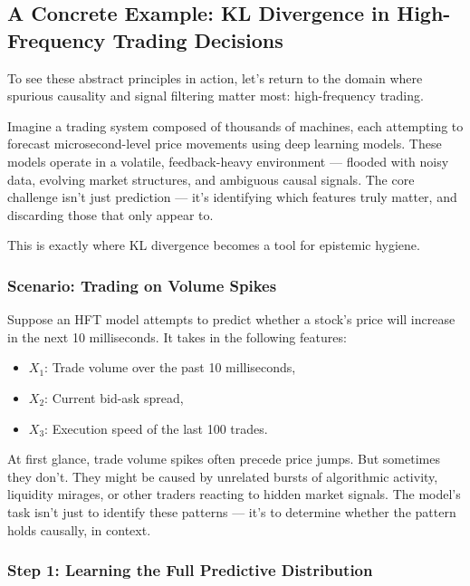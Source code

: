 \subsection{A Concrete Example: KL Divergence in High-Frequency Trading Decisions}

To see these abstract principles in action, let’s return to the domain where spurious causality and signal filtering matter most: high-frequency trading.

Imagine a trading system composed of thousands of machines, each attempting to forecast microsecond-level price movements using deep learning models. These models operate in a volatile, feedback-heavy environment — flooded with noisy data, evolving market structures, and ambiguous causal signals. The core challenge isn’t just prediction — it’s identifying which features truly matter, and discarding those that only appear to.

This is exactly where KL divergence becomes a tool for epistemic hygiene.

\subsubsection{Scenario: Trading on Volume Spikes}

Suppose an HFT model attempts to predict whether a stock’s price will increase in the next 10 milliseconds. It takes in the following features:

\begin{itemize}
    \item \( X_1 \): Trade volume over the past 10 milliseconds,
    \item \( X_2 \): Current bid-ask spread,
    \item \( X_3 \): Execution speed of the last 100 trades.
\end{itemize}

At first glance, trade volume spikes often precede price jumps. But sometimes they don't. They might be caused by unrelated bursts of algorithmic activity, liquidity mirages, or other traders reacting to hidden market signals. The model’s task isn’t just to identify these patterns — it’s to determine whether the pattern holds causally, in context.

\subsubsection{Step 1: Learning the Full Predictive Distribution}

